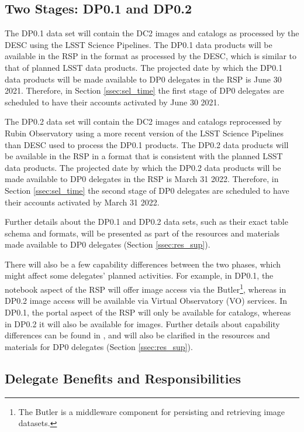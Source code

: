 \documentclass[DM,lsstdraft,authoryear,toc]{lsstdoc}
\begin{document}
\subsection{Two Stages: DP0.1 and DP0.2}\label{ssec:intro_stages}

The DP0.1 data set will contain the DC2 images and catalogs as processed by the DESC using the LSST Science Pipelines.
The DP0.1 data products will be available in the RSP in the format as processed by the DESC, which is similar to that of planned LSST data products.
The projected date by which the DP0.1 data products will be made available to DP0 delegates in the RSP is June 30 2021.
Therefore, in Section \ref{ssec:sel_time} the first stage of DP0 delegates are scheduled to have their accounts activated by June 30 2021.

The DP0.2 data set will contain the DC2 images and catalogs reprocessed by Rubin Observatory using a more recent version of the LSST Science Pipelines than DESC used to process the DP0.1 products.
The DP0.2 data products will be available in the RSP in a format that is consistent with the planned LSST data products.
The projected date by which the DP0.2 data products will be made available to DP0 delegates in the RSP is March 31 2022. 
Therefore, in Section \ref{ssec:sel_time} the second stage of DP0 delegates are scheduled to have their accounts activated by March 31 2022.

Further details about the DP0.1 and DP0.2 data sets, such as their exact table schema and formats, will be presented as part of the resources and materials made available to DP0 delegates (Section \ref{ssec:res_sup}).

There will also be a few capability differences between the two phases, which might affect some delegates' planned activities.
For example, in DP0.1, the notebook aspect of the RSP will offer image access via the Butler\footnote{The Butler is a middleware component for persisting and retrieving image datasets.}, whereas in DP0.2 image access will be available via Virtual Observatory (VO) services.
In DP0.1, the portal aspect of the RSP will only be available for catalogs, whereas in DP0.2 it will also be available for images.
Further details about capability differences can be found in , and will also be clarified in the resources and materials for DP0 delegates (Section \ref{ssec:res_sup}).


\subsection{Delegate Benefits and Responsibilities}\label{ssec:intro_del}
\end{document}
